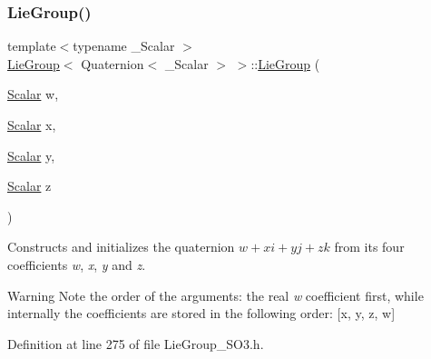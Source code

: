 \subsubsection{\texorpdfstring{Lie\+Group()}{LieGroup()}\hspace{0.1cm}{\footnotesize\ttfamily [8/9]}}
{\footnotesize\ttfamily template$<$typename \+\_\+\+Scalar $>$ \\
\hyperlink{class_lie_group}{Lie\+Group}$<$ Quaternion$<$ \+\_\+\+Scalar $>$ $>$\+::\hyperlink{class_lie_group}{Lie\+Group} (\begin{DoxyParamCaption}\item[{\hyperlink{class_lie_group_3_01_quaternion_3_01___scalar_01_4_01_4_a5c9cc4f61c2a1870f44da7951225dc4e}{Scalar}}]{w,  }\item[{\hyperlink{class_lie_group_3_01_quaternion_3_01___scalar_01_4_01_4_a5c9cc4f61c2a1870f44da7951225dc4e}{Scalar}}]{x,  }\item[{\hyperlink{class_lie_group_3_01_quaternion_3_01___scalar_01_4_01_4_a5c9cc4f61c2a1870f44da7951225dc4e}{Scalar}}]{y,  }\item[{\hyperlink{class_lie_group_3_01_quaternion_3_01___scalar_01_4_01_4_a5c9cc4f61c2a1870f44da7951225dc4e}{Scalar}}]{z }\end{DoxyParamCaption})\hspace{0.3cm}{\ttfamily [inline]}}

Constructs and initializes the quaternion $ w+xi+yj+zk $ from its four coefficients {\itshape w}, {\itshape x}, {\itshape y} and {\itshape z}.

\begin{DoxyWarning}{Warning}
Note the order of the arguments\+: the real {\itshape w} coefficient first, while internally the coefficients are stored in the following order\+: \mbox{[}{\ttfamily x}, {\ttfamily y}, {\ttfamily z}, {\ttfamily w}\mbox{]} 
\end{DoxyWarning}


Definition at line 275 of file Lie\+Group\+\_\+\+S\+O3.\+h.

\hypertarget{class_lie_group_3_01_quaternion_3_01___scalar_01_4_01_4_a6526f663ef495eab03b24a2a97ff6df2}{}\label{class_lie_group_3_01_quaternion_3_01___scalar_01_4_01_4_a6526f663ef495eab03b24a2a97ff6df2} 
